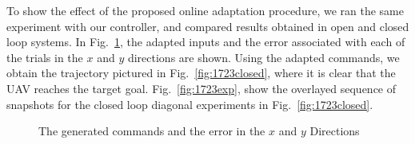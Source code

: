 \documentclass[letterpaper, 10 pt, conference]{ieeeconf}  %
\begin{document}
To show the effect of the proposed online adaptation procedure, we ran the same experiment with our controller, and compared results obtained in open and closed loop systems. In Fig.~\ref{fig:1723controlled}, the adapted inputs and the error associated with each of the trials in the $x$ and $y$ directions are shown. Using the adapted commands, we obtain the trajectory pictured in Fig.~\ref{fig:1723closed}, where it is clear that the UAV reaches the target goal. Fig.~\ref{fig:1723exp}, show the overlayed sequence of snapshots for the closed loop diagonal experiments in Fig.~\ref{fig:1723closed}.

\begin{figure}[ht]
	\centering
   	\caption{The generated commands and the error in the $x$ and $y$ Directions}
	\label{fig:1723controlled}
\end{figure}
\end{document}
